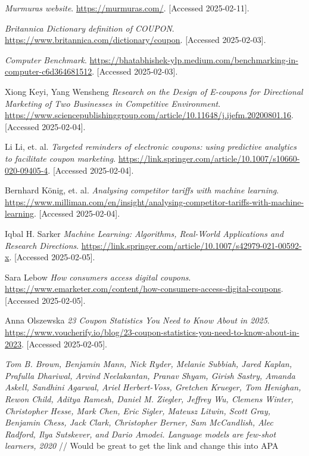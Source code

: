 \documentclass[licencjacka,en]{docs/pracamgr}
\begin{document}
\begin{thebibliography}{99}


\textit{Murmuras website}.  
\url{https://murmuras.com/}.  
[Accessed 2025-02-11].

\textit{Britannica Dictionary definition of COUPON}.  
\url{https://www.britannica.com/dictionary/coupon}.  
[Accessed 2025-02-03].

\textit{Computer Benchmark}.  
\url{https://bhatabhishek-ylp.medium.com/benchmarking-in-computer-c6d364681512}.  
[Accessed 2025-02-03].

Xiong Keyi, Yang Wensheng
\textit{Research on the Design of E-coupons for Directional Marketing of Two Businesses in Competitive Environment}.  
\url{https://www.sciencepublishinggroup.com/article/10.11648/j.ijefm.20200801.16}.  
[Accessed 2025-02-04].

Li Li, et. al.
\textit{Targeted reminders of electronic coupons: using predictive analytics to facilitate coupon marketing}.  
\url{https://link.springer.com/article/10.1007/s10660-020-09405-4}.  
[Accessed 2025-02-04].

Bernhard König, et. al.
\textit{Analysing competitor tariffs with machine learning}.  
\url{https://www.milliman.com/en/insight/analysing-competitor-tariffs-with-machine-learning}.  
[Accessed 2025-02-04].

Iqbal H. Sarker
\textit{Machine Learning: Algorithms, Real-World Applications and Research Directions}.  
\url{https://link.springer.com/article/10.1007/s42979-021-00592-x}.  
[Accessed 2025-02-05].

Sara Lebow 
\textit{How consumers access digital coupons}.  
\url{https://www.emarketer.com/content/how-consumers-access-digital-coupons}.  
[Accessed 2025-02-05].

Anna Olszewska
\textit{23 Coupon Statistics You Need to Know About in 2025}.  
\url{https://www.voucherify.io/blog/23-coupon-statistics-you-need-to-know-about-in-2023}.  
[Accessed 2025-02-05].

\textit{Tom B. Brown, Benjamin Mann, Nick Ryder, Melanie Subbiah, Jared
Kaplan, Prafulla Dhariwal, Arvind Neelakantan, Pranav Shyam, Girish
Sastry, Amanda Askell, Sandhini Agarwal, Ariel Herbert-Voss, Gretchen
Krueger, Tom Henighan, Rewon Child, Aditya Ramesh, Daniel M.
Ziegler, Jeffrey Wu, Clemens Winter, Christopher Hesse, Mark Chen,
Eric Sigler, Mateusz Litwin, Scott Gray, Benjamin Chess, Jack Clark,
Christopher Berner, Sam McCandlish, Alec Radford, Ilya Sutskever, and
Dario Amodei. Language models are few-shot learners, 2020}
// Would be great to get the link and change this into APA


\end{thebibliography}
\end{document}
